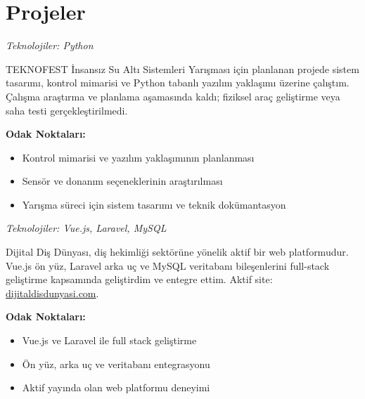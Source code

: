 \section*{Projeler}

\textit{Teknolojiler: Python}

TEKNOFEST İnsansız Su Altı Sistemleri Yarışması için planlanan projede sistem tasarımı, kontrol mimarisi ve Python tabanlı yazılım yaklaşımı üzerine çalıştım. Çalışma araştırma ve planlama aşamasında kaldı; fiziksel araç geliştirme veya saha testi gerçekleştirilmedi.

\vspace{0.2cm}
\noindent \textbf{Odak Noktaları:}
\begin{itemize}
    \item Kontrol mimarisi ve yazılım yaklaşımının planlanması
    \item Sensör ve donanım seçeneklerinin araştırılması
    \item Yarışma süreci için sistem tasarımı ve teknik dokümantasyon
\end{itemize}

\vspace{0.5cm}

\textit{Teknolojiler: Vue.js, Laravel, MySQL}

Dijital Diş Dünyası, diş hekimliği sektörüne yönelik aktif bir web platformudur. Vue.js ön yüz, Laravel arka uç ve MySQL veritabanı bileşenlerini full-stack geliştirme kapsamında geliştirdim ve entegre ettim. Aktif site: \href{https://dijitaldisdunyasi.com/}{dijitaldisdunyasi.com}.

\vspace{0.2cm}
\noindent \textbf{Odak Noktaları:}
\begin{itemize}
    \item Vue.js ve Laravel ile full stack geliştirme
    \item Ön yüz, arka uç ve veritabanı entegrasyonu
    \item Aktif yayında olan web platformu deneyimi
\end{itemize}
